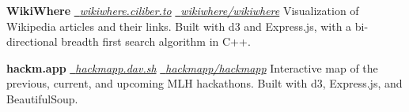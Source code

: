 \documentclass[10pt]{article}
\begin{document}
\begin{minipage}[t]{0.7\textwidth}
\begin{flushleft}
  \vspace{0.25cm}

  \textbf{WikiWhere} \hfill \href{https://wikiwhere.ciliber.to/}{\faLink \, \textit{wikiwhere.ciliber.to}} \quad \href{https://github.com/wikiwhere/wikiwhere}{\faGithub \, \textit{wikiwhere/wikiwhere}} \newline
  Visualization of Wikipedia articles and their links. Built with d3 and Express.js, with a bi-directional breadth first search algorithm in C++.

  \vspace{0.25cm}

  \textbf{hackm.app} \hfill \href{https://hackmapp.dav.sh/}{\faLink \, \textit{hackmapp.dav.sh}} \quad \href{https://github.com/hackmapp/hackmapp}{\faGithub \, \textit{hackmapp/hackmapp}} \newline
  Interactive map of the previous, current, and upcoming MLH hackathons. Built with d3, Express.js, and BeautifulSoup.

  \end{flushleft}
\end{minipage}
\end{document}
